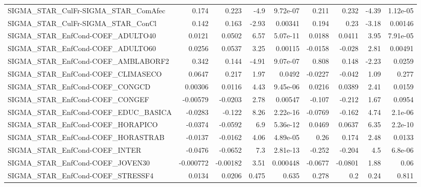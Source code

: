 \begin{tabular}{lrrrrrrrr}
SIGMA\_STAR\_CulFr-SIGMA\_STAR\_ComAfec   &       0.174 &        0.223 &     -4.9 & 9.72e-07 &      0.211 &       0.232 &        -4.39 &      1.12e-05 \\
SIGMA\_STAR\_CulFr-SIGMA\_STAR\_ConCl     &       0.142 &        0.163 &    -2.93 &  0.00341 &      0.194 &        0.23 &        -3.18 &       0.00146 \\
SIGMA\_STAR\_EnfCond-COEF\_ADULTO40      &      0.0121 &       0.0502 &     6.57 & 5.07e-11 &     0.0188 &      0.0411 &         3.95 &      7.91e-05 \\
SIGMA\_STAR\_EnfCond-COEF\_ADULTO60      &      0.0256 &       0.0537 &     3.25 &  0.00115 &    -0.0158 &      -0.028 &         2.81 &       0.00491 \\
SIGMA\_STAR\_EnfCond-COEF\_AMBLABORF2    &       0.342 &        0.144 &    -4.91 & 9.07e-07 &      0.808 &       0.148 &        -2.23 &        0.0259 \\
SIGMA\_STAR\_EnfCond-COEF\_CLIMASECO     &      0.0647 &        0.217 &     1.97 &   0.0492 &    -0.0227 &      -0.042 &         1.09 &         0.277 \\
SIGMA\_STAR\_EnfCond-COEF\_CONGCD        &     0.00306 &       0.0116 &     4.43 & 9.45e-06 &     0.0216 &      0.0389 &         2.41 &        0.0159 \\
SIGMA\_STAR\_EnfCond-COEF\_CONGEF        &    -0.00579 &      -0.0203 &     2.78 &  0.00547 &     -0.107 &      -0.212 &         1.67 &        0.0954 \\
SIGMA\_STAR\_EnfCond-COEF\_EDUC\_BASICA   &     -0.0283 &       -0.122 &     8.26 & 2.22e-16 &    -0.0769 &      -0.162 &         4.74 &       2.1e-06 \\
SIGMA\_STAR\_EnfCond-COEF\_HORAPICO      &     -0.0374 &      -0.0592 &      6.9 & 5.36e-12 &     0.0469 &      0.0637 &         6.35 &       2.2e-10 \\
SIGMA\_STAR\_EnfCond-COEF\_HORASTRAB     &     -0.0137 &      -0.0162 &     4.06 & 4.89e-05 &       0.26 &       0.174 &         2.48 &        0.0133 \\
SIGMA\_STAR\_EnfCond-COEF\_INTER         &     -0.0476 &      -0.0652 &      7.3 & 2.81e-13 &     -0.252 &      -0.204 &          4.5 &       6.8e-06 \\
SIGMA\_STAR\_EnfCond-COEF\_JOVEN30       &   -0.000772 &     -0.00182 &     3.51 & 0.000448 &    -0.0677 &     -0.0801 &         1.88 &          0.06 \\
SIGMA\_STAR\_EnfCond-COEF\_STRESSF4      &      0.0134 &       0.0206 &    0.475 &    0.635 &      0.278 &         0.2 &         0.24 &         0.811 \\

\end{tabular}

